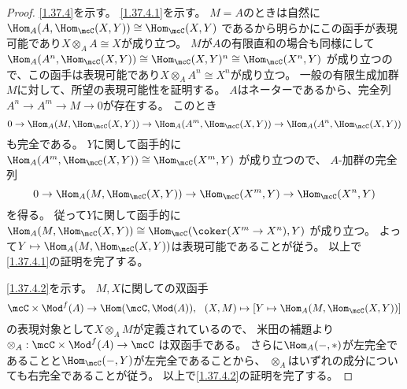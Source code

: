 \documentclass[uplatex,dvipdfmx]{jsarticle}
\begin{document}
\begin{proof}
  \ref{1.37.4}を示す。
  \ref{1.37.4.1}を示す。
  \(M=A\)のときは自然に
  \(\Hom_A(A,\Hom_{\mcC}(X,Y)) \cong \Hom_{\mcC}(X,Y)\)
  であるから明らかにこの函手が表現可能であり\(X\otimes_A A\cong X\)が成り立つ。
  \(M\)が\(A\)の有限直和の場合も同様にして
  \(\Hom_A(A^n,\Hom_{\mcC}(X,Y))\cong \Hom_{\mcC}(X,Y)^n \cong \Hom_{\mcC}(X^n,Y)\)
  が成り立つので、この函手は表現可能であり\(X\otimes_A A^n \cong X^n\)が成り立つ。
  一般の有限生成加群\(M\)に対して、所望の表現可能性を証明する。
  \(A\)はネーターであるから、完全列
  \(A^n\to A^m\to M\to 0\)が存在する。
  このとき
  \[
  0 \to \Hom_A(M,\Hom_{\mcC}(X,Y)) \to \Hom_A(A^m,\Hom_{\mcC}(X,Y))
  \to \Hom_A(A^n,\Hom_{\mcC}(X,Y))
  \]
  も完全である。
  \(Y\)に関して函手的に
  \(\Hom_A(A^m,\Hom_{\mcC}(X,Y)) \cong \Hom_{\mcC}(X^m,Y)\)
  が成り立つので、
  \(A\)-加群の完全列
  \[
  0\to \Hom_A(M,\Hom_{\mcC}(X,Y)) \to \Hom_{\mcC}(X^m,Y)\to \Hom_{\mcC}(X^n,Y)
  \]
  を得る。
  従って\(Y\)に関して函手的に
  \(\Hom_A(M,\Hom_{\mcC}(X,Y)) \cong \Hom_{\mcC}(\coker(X^m\to X^n),Y)\)
  が成り立つ。
  よって\(Y\mapsto \Hom_A(M,\Hom_{\mcC}(X,Y))\)は表現可能であることが従う。
  以上で\ref{1.37.4.1}の証明を完了する。

  \ref{1.37.4.2}を示す。
  \(M,X\)に関しての双函手
  \[
  \mcC\times \Mod^f(A) \to \Hom(\mcC,\Mod(A)), \ \
  (X,M)\mapsto [Y\mapsto \Hom_A(M,\Hom_{\mcC}(X,Y))]\]
  の表現対象として\(X\otimes_A M\)が定義されているので、
  米田の補題より\(\otimes_A:\mcC\times \Mod^f(A)\to \mcC\)
  は双函手である。
  さらに\(\Hom_A(-,*)\)が左完全であることと\(\Hom_{\mcC}(-,Y)\)が左完全であることから、
  \(\otimes_A\)はいずれの成分についても右完全であることが従う。
  以上で\ref{1.37.4.2}の証明を完了する。


\end{proof}
\end{document}
